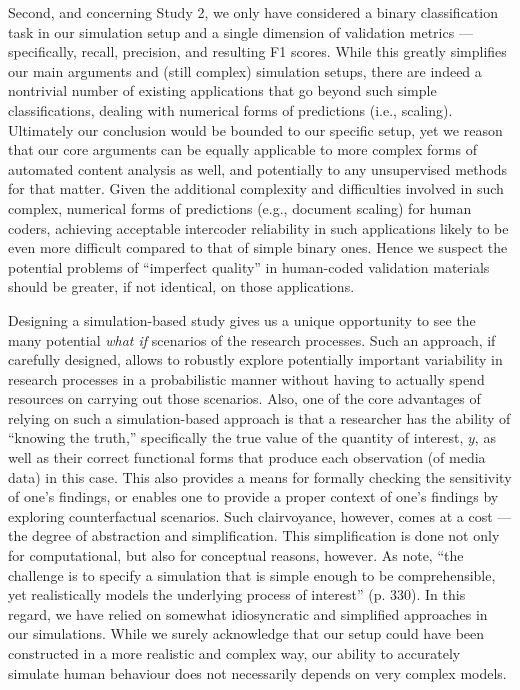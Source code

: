 \documentclass[man, 12pt, a4paper, nolmodern, noextraspace]{apa6}
\begin{document}
    Second, and concerning Study 2, we only have considered a binary classification task in our simulation setup and a single dimension of validation metrics --- specifically, recall, precision, and resulting F1 scores. While this greatly simplifies our main arguments and (still complex) simulation setups, there are indeed a nontrivial number of existing applications that go beyond such simple classifications, dealing with numerical forms of predictions (i.e., scaling). Ultimately our conclusion would be bounded to our specific setup, yet we reason that our core arguments can be equally applicable to more complex forms of automated content analysis as well, and potentially to any unsupervised methods for that matter. Given the additional complexity and difficulties involved in such complex, numerical forms of predictions (e.g., document scaling) for human coders, achieving acceptable intercoder reliability in such applications likely to be even more difficult compared to that of simple binary ones. Hence we suspect the potential problems of \enquote{imperfect quality} in human-coded validation materials should be greater, if not identical, on those applications. 

    Designing a simulation-based study gives us a unique opportunity to see the many potential \textit{what if} scenarios of the research processes. Such an approach, if carefully designed, allows to robustly explore potentially important variability in research processes in a probabilistic manner without having to actually spend resources on carrying out those scenarios. Also, one of the core advantages of relying on such a simulation-based approach is that a researcher has the ability of \enquote{knowing the truth,} specifically the true value of the quantity of interest, $y$, as well as their correct functional forms that produce each observation (of media data) in this case. This also provides a means for formally checking the sensitivity of one’s findings, or enables one to provide a proper context of one's findings by exploring counterfactual scenarios. Such clairvoyance, however, comes at a cost --- the degree of abstraction and simplification. This simplification is done not only for computational, but also for conceptual reasons, however. As \textcite{scharkow2017measurement} note, \enquote{the challenge is to specify a simulation that is simple enough to be comprehensible, yet realistically models the underlying process of interest} (p. 330). In this regard, we have relied on somewhat idiosyncratic and simplified approaches in our simulations. While we surely acknowledge that our setup could have been constructed in a more realistic and complex way, our ability to accurately simulate human behaviour does not necessarily depends on very complex models. 
\end{document}
